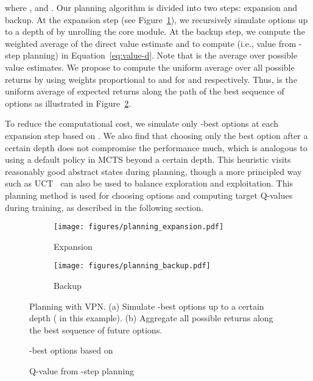 \documentclass{article}
\begin{document}
where , and . Our planning algorithm is divided into two steps: expansion and backup. At the expansion step (see Figure~\ref{fig:planning-expansion}), we recursively simulate options up to a depth of  by unrolling the core module.
At the backup step, we compute the weighted average of the direct value estimate  and  to compute  (i.e., value from -step planning) in Equation~\ref{eq:value-d}. Note that  is the average over  possible value estimates. We propose to compute the uniform average over all possible returns by using weights proportional to  and  for  and  respectively. Thus,  is the uniform average of  expected returns along the path of the best sequence of options as illustrated in Figure~\ref{fig:planning-backup}.

To reduce the computational cost, we simulate only -best options at each expansion step based on . We also find that choosing only the best option after a certain depth does not compromise the performance much, which is analogous to using a default policy in MCTS beyond a certain depth. This heuristic visits reasonably good abstract states during planning, though a more principled way such as UCT~\cite{kocsis2006bandit} can also be used to balance exploration and exploitation. This planning method is used for choosing options and computing target Q-values during training, as described in the following section.



\begin{figure}
\centering
\begin{minipage}{.53\textwidth}
	\centering
	\begin{subfigure}{0.49\linewidth}	
		\texttt{[image: figures/planning\_expansion.pdf]}
  		\caption{Expansion }
  		\label{fig:planning-expansion}
	\end{subfigure}
	\hfill
	\begin{subfigure}{0.49\linewidth}	
		\texttt{[image: figures/planning\_backup.pdf]}
  		\caption{Backup }
  		\label{fig:planning-backup}
	\end{subfigure}
	\vspace{-5pt}
	\caption{Planning with VPN. (a) Simulate -best options up to a certain depth ( in this example). (b) Aggregate all possible returns along the best sequence of future options. }\label{fig:planning}
\end{minipage}
\hfill
\begin{minipage}{.45\textwidth}
\vspace{-0.4in}
\begin{algorithm}[H]
\small
\caption{Q-value from -step planning}\label{alg:planning}
\begin{algorithmic}
    \State 
\If {}
		\State \Return 
	\EndIf
	\State  -best options based on 
\For {}
		\State  {}
	\EndFor
    \State \Return 
\EndFunction
\end{algorithmic}
\end{algorithm}
\vspace{-0.4in}
\end{minipage}
\vspace{-10pt}
\end{figure}
\end{document}
